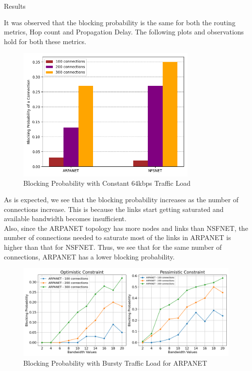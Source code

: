 \begin{section}{Results}

It was observed that the blocking probability is the same for both the routing metrics, Hop count and Propagation Delay. The following plots and observations hold for both these metrics. \\

\begin{figure}[H]
    \centering
    \includegraphics[width=0.8\textwidth]{figures/fig1/fig1.png}
    \caption{Blocking Probability with Constant 64kbps Traffic Load \protect\footnotemark}
    \label{fig:fig1}
\end{figure}

As is expected, we see that the blocking probability increases as the number of connections increase. This is because the links start getting saturated and available bandwidth becomes insufficient. \\
Also, since the ARPANET topology has more nodes and links than NSFNET, the number of connections needed to saturate most of the links in ARPANET is higher than that for NSFNET. Thus, we see that for the same number of connections, ARPANET has a lower blocking probability. \\ 


\pagebreak

\begin{figure}[H]
    \centering
    \includegraphics[width=\textwidth]{figures/fig2/fig2a.png}
    \caption{Blocking Probability with Bursty Traffic Load for ARPANET}
    \label{fig:fig2a}
\end{figure}



\end{section}
